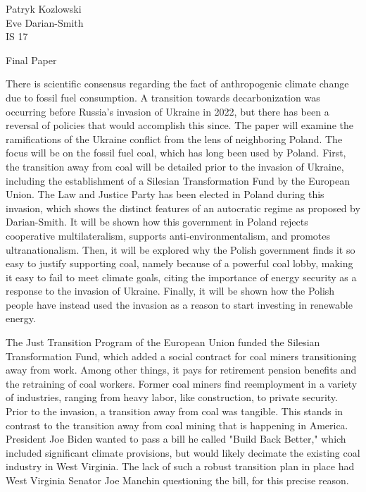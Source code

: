 \documentclass[12pt,letterpaper]{article}
\renewcommand{\maketitle}{\makemlaheader}
\renewcommand{\maketitle}{\makemlaheader}
\newcommand{\makemlaheader}{
Patryk Kozlowski \\
Eve Darian-Smith\\
IS 17\\
\begin{center}\textnormal{Final Paper}\end{center}

}
\begin{document}
\begin{flushleft}

\setlength{\parindent}{0.5in}

\maketitle
There is scientific consensus regarding the fact of anthropogenic climate change due to fossil fuel consumption. A transition towards decarbonization was occurring before Russia's invasion of Ukraine in 2022, but there has been a reversal of policies that would accomplish this since. The paper will examine the ramifications of the Ukraine conflict from the lens of neighboring Poland. The focus will be on the fossil fuel coal, which has long been used by Poland. First, the transition away from coal will be detailed prior to the invasion of Ukraine, including the establishment of a Silesian Transformation Fund by the European Union. The Law and Justice Party has been elected in Poland during this invasion, which shows the distinct features of an autocratic regime as proposed by Darian-Smith. \autocite{darian-smith_global_2022} It will be shown how this government in Poland rejects cooperative multilateralism, supports anti-environmentalism, and promotes ultranationalism. Then, it will be explored why the Polish government finds it so easy to justify supporting coal, namely because of a powerful coal lobby, making it easy to fail to meet climate goals, citing the importance of energy security as a response to the invasion of Ukraine. Finally, it will be shown how the Polish people have instead used the invasion as a reason to start investing in renewable energy.

The Just Transition Program of the European Union funded the Silesian Transformation Fund, which added a social contract for coal miners transitioning away from work. Among other things, it pays for retirement pension benefits and the retraining of coal workers. Former coal miners find reemployment in a variety of industries, ranging from heavy labor, like construction, to private security. \autocite{sniegocki_just_2022} Prior to the invasion, a transition away from coal was tangible. This stands in contrast to the transition away from coal mining that is happening in America. President Joe Biden wanted to pass a bill he called "Build Back Better," which included significant climate provisions, but would likely decimate the existing coal industry in West Virginia. The lack of such a robust transition plan in place had West Virginia Senator Joe Manchin questioning the bill, for this precise reason. \autocite{scheiber_achilles_2021}


\end{flushleft}
\end{document}
